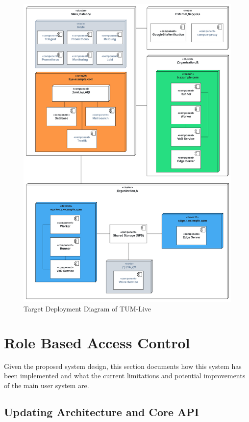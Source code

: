 \begin{figure}[htpb]
    \centering
    \includegraphics[width=390pt]{images/NewDeploymentDiagram.png}
    \caption[Target System Architecture]{Target Deployment Diagram of TUM-Live}\label{fig:system-architecture}
\end{figure}

\newpage


\section{Role Based Access Control}

Given the proposed system design, this section documents how this system has been implemented and what the current limitations and potential improvements of the main user system are. 

\subsection{Updating Architecture and Core API}

